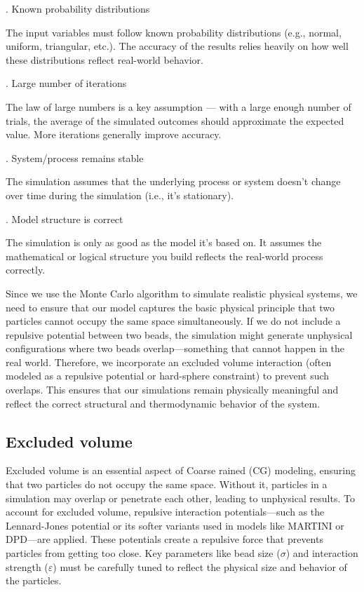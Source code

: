 \documentclass[12pt]{article}
\begin{document}
\begin{flushleft}
. Known probability distributions
    
The input variables must follow known probability distributions (e.g., normal, uniform, triangular, etc.). The accuracy of the results relies heavily on how well these distributions reflect real-world behavior.

. Large number of iterations
    
The law of large numbers is a key assumption — with a large enough number of trials, the average of the simulated outcomes should approximate the expected value. More iterations generally improve accuracy.

. System/process remains stable
    
The simulation assumes that the underlying process or system doesn’t change over time during the simulation (i.e., it's stationary).

. Model structure is correct

The simulation is only as good as the model it's based on. It assumes the mathematical or logical structure you build reflects the real-world process correctly.




Since we use the Monte Carlo algorithm to simulate realistic physical systems, we need to ensure that our model captures the basic physical principle that two particles cannot occupy the same space simultaneously. If we do not include a repulsive potential between two beads, the simulation might generate unphysical configurations where two beads overlap—something that cannot happen in the real world. Therefore, we incorporate an excluded volume interaction (often modeled as a repulsive potential or hard-sphere constraint) to prevent such overlaps. This ensures that our simulations remain physically meaningful and reflect the correct structural and thermodynamic behavior of the system.

\vspace{-1em} 
\subsection*{Excluded volume}

Excluded volume is an essential aspect of Coarse rained (CG) modeling, ensuring that two particles do not occupy the same space. Without it, particles in a simulation may overlap or penetrate each other, leading to unphysical results. To account for excluded volume, repulsive interaction potentials—such as the Lennard-Jones potential or its softer variants used in models like MARTINI or DPD—are applied. These potentials create a repulsive force that prevents particles from getting too close. Key parameters like bead size ($\sigma$) and interaction strength ($\varepsilon$) must be carefully tuned to reflect the physical size and behavior of the particles.


\end{flushleft}
\end{document}
